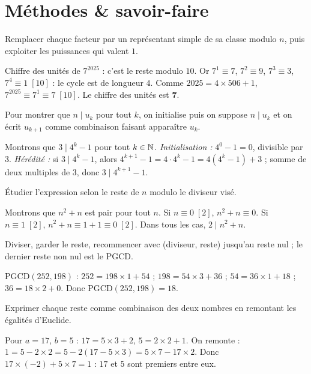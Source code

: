 \section{Méthodes \& savoir-faire}

Remplacer chaque facteur par un représentant simple de sa classe modulo $n$, puis exploiter les puissances qui valent $1$.
\begin{exemple}
Chiffre des unités de $7^{2025}$ : c'est le reste modulo $10$. Or $7^{1}\equiv 7$, $7^{2}\equiv 9$, $7^{3}\equiv 3$, $7^{4}\equiv 1\;[10]$ : le cycle est de longueur $4$. Comme $2025=4\times 506+1$, $7^{2025}\equiv 7^{1}\equiv 7\;[10]$. Le chiffre des unités est $\mathbf 7$.
\end{exemple}

Pour montrer que $n\mid u_k$ pour tout $k$, on initialise puis on suppose $n\mid u_k$ et on écrit $u_{k+1}$ comme combinaison faisant apparaître $u_k$.
\begin{exemple}
Montrons que $3\mid 4^{k}-1$ pour tout $k\in\mathbb{N}$. \emph{Initialisation :} $4^{0}-1=0$, divisible par $3$. \emph{Hérédité :} si $3\mid 4^{k}-1$, alors $4^{k+1}-1=4\cdot 4^{k}-1=4(4^{k}-1)+3$ ; somme de deux multiples de $3$, donc $3\mid 4^{k+1}-1$.
\end{exemple}

Étudier l'expression selon le reste de $n$ modulo le diviseur visé.
\begin{exemple}
Montrons que $n^2+n$ est pair pour tout $n$. Si $n\equiv 0\;[2]$, $n^2+n\equiv 0$. Si $n\equiv 1\;[2]$, $n^2+n\equiv 1+1\equiv 0\;[2]$. Dans tous les cas, $2\mid n^2+n$.
\end{exemple}

Diviser, garder le reste, recommencer avec (diviseur, reste) jusqu'au reste nul ; le dernier reste non nul est le PGCD.
\begin{exemple}
$\mathrm{PGCD}(252,198)$ : $252=198\times1+54$ ; $198=54\times3+36$ ; $54=36\times1+18$ ; $36=18\times2+0$. Donc $\mathrm{PGCD}(252,198)=18$.
\end{exemple}

Exprimer chaque reste comme combinaison des deux nombres en remontant les égalités d'Euclide.
\begin{exemple}
Pour $a=17$, $b=5$ : $17=5\times3+2$, $5=2\times2+1$. On remonte : $1=5-2\times2=5-2(17-5\times3)=5\times7-17\times2$. Donc $17\times(-2)+5\times7=1$ : $17$ et $5$ sont premiers entre eux.
\end{exemple}

